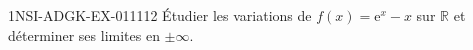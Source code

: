 \begin{exercice}{1NSI-ADGK-EX-011}{1}{12}
Étudier les variations de $f(x) = \mathrm{e}^x - x$ sur $\mathbb{R}$ et déterminer ses limites en $\pm\infty$.

\end{exercice}
